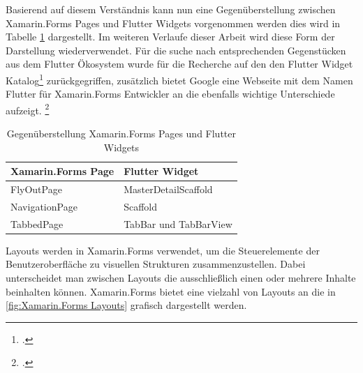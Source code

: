 \begin{minipage}{\linewidth}

\end{minipage}


Basierend auf diesem Verständnis kann nun eine Gegenüberstellung zwischen Xamarin.Forms Pages und Flutter Widgets vorgenommen werden dies wird in Tabelle \ref{tab:ComapreXFFlutter} dargestellt.  Im weiteren Verlaufe dieser Arbeit wird diese Form der Darstellung wiederverwendet.  Für die suche nach entsprechenden Gegenstücken aus dem Flutter Ökosystem wurde für die Recherche auf den den Flutter Widget Katalog\footcite[Vgl.][Abgerufen am \today]{GoogleFlutterWidgetCatalog2020} zurückgegriffen,  zusätzlich bietet Google eine Webseite mit dem Namen Flutter für Xamarin.Forms Entwickler an die ebenfalls wichtige Unterschiede aufzeigt. \footcite[Vgl.][Abgerufen am \today]{FlutterForXFDevs}

\begin{table}[!ht]
\begin{tabularx}{\textwidth}{X|X}
   \textbf{Xamarin.Forms Page} & \textbf{Flutter Widget}  \\
\hline
	FlyOutPage             & MasterDetailScaffold          	\\ 
	NavigationPage       & Scaffold         	 					\\ 
	TabbedPage            & TabBar und TabBarView 		\\ 
\end{tabularx}
\caption{Gegenüberstellung Xamarin.Forms Pages und Flutter Widgets}
 \label{tab:ComapreXFFlutter}
\end{table}


Layouts werden in Xamarin.Forms verwendet, um die Steuerelemente der Benutzeroberfläche zu visuellen Strukturen zusammenzustellen.  Dabei unterscheidet man zwischen Layouts die ausschließlich einen oder mehrere Inhalte beinhalten können.  Xamarin.Forms bietet eine vielzahl von Layouts an die in \ref{fig:Xamarin.Forms Layouts} grafisch dargestellt werden.


